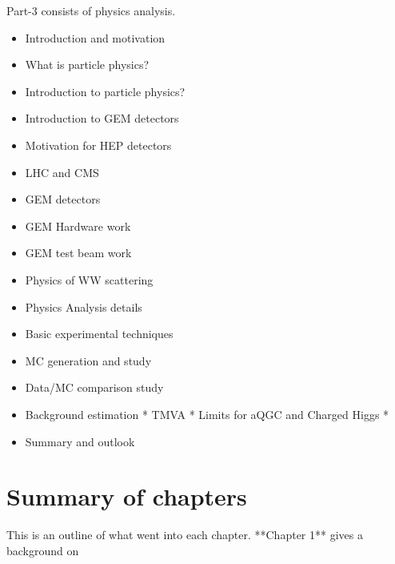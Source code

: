 Part-3 consists of physics analysis.

\begin{itemize}
\item Introduction and motivation     
\item What is particle physics?     
\item Introduction to particle physics?
\item Introduction to GEM detectors 
\item Motivation for HEP detectors
\item LHC and CMS 
\item GEM detectors 
\item GEM Hardware work
\item GEM test beam work
\item Physics of WW scattering  
\item Physics Analysis details     
\item Basic experimental techniques     
\item MC generation and study     
\item Data/MC comparison study    
\item Background estimation     * TMVA     * Limits for aQGC and Charged Higgs *
\item Summary and outlook
\end{itemize}

\section{Summary of chapters}

This is an outline of what went into each chapter. **Chapter 1** gives a
background on